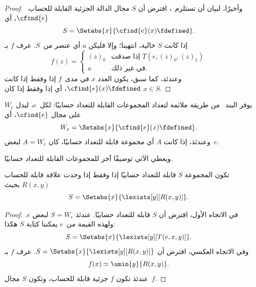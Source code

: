 \documentclass[../../../include/open-logic-section]{subfiles}
\begin{document}
\begin{proof}
وأخيرًا، لبيان أن  تستلزم~، افترض
أن $S$ مجال الدالة الجزئية القابلة للحساب~$\cfind{e}$، أي
\[
S = \Setabs{x}{\cfind{e}(x) \fdefined}.
\]
إذا كانت $S$ خالية، انتهينا؛ وإلا فليكن $a$ أي عنصر من~$S$. عرف $f$ بـ
\[
f(z) = \begin{cases}
(z)_0 & \text{إذا صدقت $T(e,(z)_0,(z)_1)$} \\
a & \text{في غير ذلك.}
\end{cases}
\]
وعندئذ، كما سبق، يكون العدد $x$ في مدى~$f$ إذا وفقط إذا كانت
$\cfind{e}(x)\fdefined$، أي إذا وفقط إذا كان $x\in S$.
\end{proof}

يوفر البند~ من  طريقة ملائمة
لتعداد المجموعات القابلة للتعداد حسابيًا: لكل~$e$، ليدل $W_e$ على مجال
$\cfind{e}$، أي
\[
W_e = \Setabs{x}{\cfind{e}(x) \fdefined}.
\]
وعندئذ، إذا كانت $A$ أي مجموعة قابلة للتعداد حسابيًا، كان
$A=W_e$ لبعض~$e$.

ويعطي الآتي توصيفًا آخر للمجموعات القابلة للتعداد حسابيًا.

\begin{thm}
تكون المجموعة $S$ قابلة للتعداد حسابيًا إذا وفقط إذا وجدت علاقة قابلة
للحساب $R(x,y)$ بحيث
\[
S = \Setabs{ x }{ \lexists[y][R(x,y)] }.
\]
\end{thm}

\begin{proof}
في الاتجاه الأول، افترض أن $S$ قابلة للتعداد حسابيًا. عندئذ
$S=W_e$ لبعض $e$. ولهذه القيمة من~$e$ يمكننا كتابة $S$ هكذا:
\[
S = \Setabs{ x }{ \lexists[y][T(e, x, y)] }.
\]
وفي الاتجاه العكسي، افترض أن
$S=\Setabs{x}{\lexists[y][R(x,y)]}$. عرف $f$ بـ
\[
f(x) \simeq \umin{y}{R(x, y)}.
\]
عندئذ تكون $f$ جزئية قابلة للحساب، وتكون $S$ مجال~$f$.
\end{proof}
\end{document}
